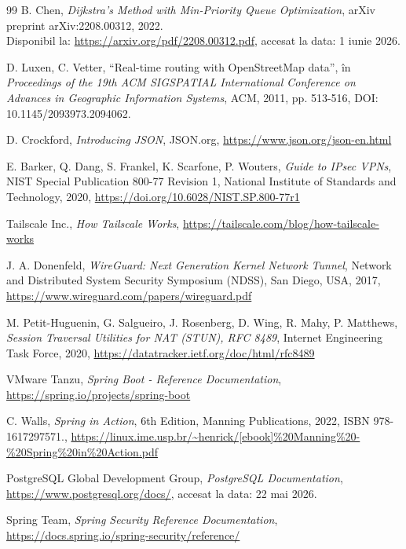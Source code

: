 ﻿\documentclass[12pt, a4paper, twoside, romanian]{teza-upb}
\begin{document}
\begin{thebibliography}{99}
B. Chen,
\textit{Dijkstra's Method with Min-Priority Queue Optimization},
arXiv preprint arXiv:2208.00312, 2022.
\\Disponibil la: \url{https://arxiv.org/pdf/2208.00312.pdf},
accesat la data: 1 iunie 2026.

D. Luxen, C. Vetter,
``Real-time routing with OpenStreetMap data'',
în \textit{Proceedings of the 19th ACM SIGSPATIAL International Conference
on Advances in Geographic Information Systems}, ACM, 2011, pp. 513-516,
DOI: 10.1145/2093973.2094062.

D. Crockford,
\emph{Introducing JSON},
JSON.org,
\url{https://www.json.org/json-en.html}



E. Barker, Q. Dang, S. Frankel, K. Scarfone, P. Wouters,
\emph{Guide to IPsec VPNs},
NIST Special Publication 800-77 Revision 1,
National Institute of Standards and Technology, 2020,
\url{https://doi.org/10.6028/NIST.SP.800-77r1}

Tailscale Inc.,
\emph{How Tailscale Works},
\url{https://tailscale.com/blog/how-tailscale-works}

J. A. Donenfeld,
\emph{WireGuard: Next Generation Kernel Network Tunnel},
Network and Distributed System Security Symposium (NDSS), San Diego, USA, 2017,
\url{https://www.wireguard.com/papers/wireguard.pdf}

M. Petit-Huguenin, G. Salgueiro, J. Rosenberg, D. Wing, R. Mahy, P. Matthews,
\emph{Session Traversal Utilities for NAT (STUN), RFC 8489},
Internet Engineering Task Force, 2020,
\url{https://datatracker.ietf.org/doc/html/rfc8489}


VMware Tanzu,
\emph{Spring Boot - Reference Documentation},
\url{https://spring.io/projects/spring-boot}



C. Walls,
\textit{Spring in Action}, 6th Edition,
Manning Publications, 2022, ISBN 978-1617297571.,
\url{https://linux.ime.usp.br/~henrick/[ebook]%20Manning%20-%20Spring%20in%20Action.pdf}

PostgreSQL Global Development Group,
\textit{PostgreSQL Documentation},
\\\url{https://www.postgresql.org/docs/},
accesat la data: 22 mai 2026.


Spring Team,
\textit{Spring Security Reference Documentation},
\\\url{https://docs.spring.io/spring-security/reference/}




\end{thebibliography}
\end{document}
